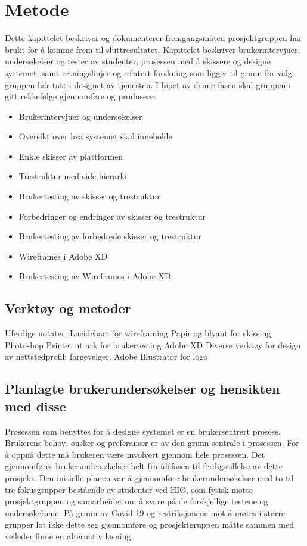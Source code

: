 \cleardoublepage
\chapter{Metode}
\label{chap:method}

Dette kapittelet beskriver og dokumenterer fremgangsmåten prosjektgruppen har brukt for å komme frem til sluttresultatet. Kapittelet beskriver brukerintervjuer, undersøkelser og tester av studenter, prosessen med å skissere og designe systemet, samt retningslinjer og relatert forskning som ligger til grunn for valg gruppen har tatt i designet av tjenesten.
I løpet av denne fasen skal gruppen i gitt rekkefølge gjennomføre og produsere:
\begin{itemize}
\item Brukerintervjuer og undersøkelser
\item Oversikt over hva systemet skal inneholde
\item Enkle skisser av plattformen
\item Trestruktur med side-hierarki
\item Brukertesting av skisser og trestruktur
\item Forbedringer og endringer av skisser og trestruktur
\item Brukertesting av forbedrede skisser og trestruktur
\item Wireframes i Adobe XD
\item Brukertesting av Wireframes i Adobe XD
\end{itemize}
\section{Verktøy og metoder}
Uferdige notater:
Lucidchart for wireframing
Papir og blyant for skissing
Photoshop
Printet ut ark for brukertesting
Adobe XD
Diverse verktøy for design av nettstedprofil: fargevelger, Adobe Illustrator for logo


\section{Planlagte brukerundersøkelser og hensikten med disse}
Prosessen som benyttes for å designe systemet er en brukersentrert prosess. Brukerens behov, ønsker og preferanser er av den grunn sentrale i prosessen. For å oppnå dette må brukeren være involvert gjennom hele prosessen. Det gjennomføres brukerundersøkelser helt fra idéfasen til ferdigstillelse av dette prosjekt.
Den initielle planen var å gjennomføre brukerundersøkelser med to til tre fokusgrupper bestående av studenter ved HIØ, som fysisk møtte prosjektgruppen og samarbeidet om å svare på de forskjellige testene og undersøkelsene. På grunn av Covid-19 og restriksjonene mot å møtes i større grupper lot ikke dette seg gjennomføre og prosjektgruppen måtte sammen med veileder finne en alternativ løsning.

